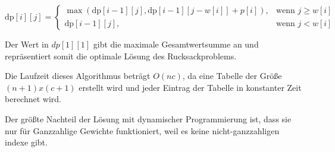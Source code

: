 \begin{equation}
    \text{dp}[i][j] = \begin{cases}
        \max(\text{dp}[i-1][j], \text{dp}[i-1][j-w[i]] + p[i]), & \text{wenn } j \geq w[i] \\
        \text{dp}[i-1][j], & \text{wenn } j < w[i]
    \end{cases}
\end{equation}


Der Wert in $dp[1][1]$ gibt die maximale Gesamtwertsumme an und 
repräsentiert somit die optimale Lösung des Rucksackproblems.

Die Laufzeit dieses Algorithmus beträgt $O(nc)$, da 
eine Tabelle der Größe $(n+1) x (c+1)$ erstellt wird und 
jeder Eintrag der Tabelle in konstanter Zeit berechnet wird.

Der größte Nachteil der Lösung mit dynamischer Programmierung ist, dass 
sie nur für Ganzzahlige Gewichte funktioniert, weil es keine nicht-ganzzahligen 
indexe gibt.\ \cite[vgl.]{Martello1987}